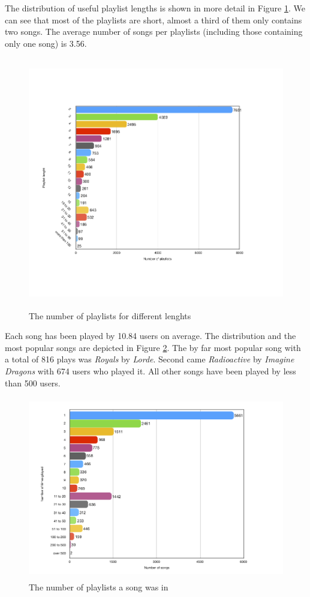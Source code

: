 The distribution of useful playlist lengths is shown in more detail in Figure \ref{fig:playlist_lenght_distribution}. We can see that most of the playlists are short, almost a third of them only contains two songs. The average number of songs per playlists (including those containing only one song) is 3.56. 
\begin{figure}[ht]
    \centering
	\includegraphics[height=110mm]{./img/playlist_description.png}
	\caption{The number of playlists for different lenghts}
	\label{fig:playlist_lenght_distribution}
\end{figure}

Each song has been played by 10.84 users on average. The distribution and the most popular songs are depicted in Figure \ref{fig:popular_song_distribution}. The by far most popular song with a total of 816 plays was \textit{Royals} by \textit{Lorde}. Second came \textit{Radioactive} by \textit{Imagine Dragons} with 674 users who played it. All other songs have been played by less than 500 users.

\begin{figure}[ht]
    \centering
	\includegraphics[height=80mm]{./img/popular_song_distribution.png}
	\caption{The number of playlists a song was in}
	\label{fig:popular_song_distribution}
\end{figure}
